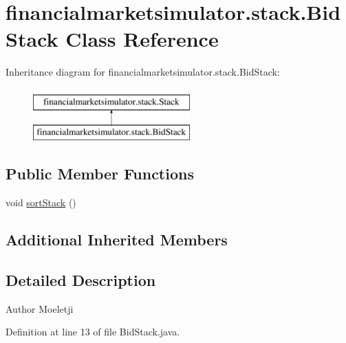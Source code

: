 \hypertarget{classfinancialmarketsimulator_1_1stack_1_1_bid_stack}{\section{financialmarketsimulator.\+stack.\+Bid\+Stack Class Reference}
\label{classfinancialmarketsimulator_1_1stack_1_1_bid_stack}
}
Inheritance diagram for financialmarketsimulator.\+stack.\+Bid\+Stack\+:\begin{figure}[H]
\begin{center}
\leavevmode
\includegraphics[height=2.000000cm]{classfinancialmarketsimulator_1_1stack_1_1_bid_stack}
\end{center}
\end{figure}
\subsection*{Public Member Functions}
\begin{DoxyCompactItemize}
\item 
void \hyperlink{classfinancialmarketsimulator_1_1stack_1_1_bid_stack_a5c2694a816c3fb93081f61554d60fc42}{sort\+Stack} ()
\end{DoxyCompactItemize}
\subsection*{Additional Inherited Members}


\subsection{Detailed Description}
\begin{DoxyAuthor}{Author}
Moeletji 
\end{DoxyAuthor}


Definition at line 13 of file Bid\+Stack.\+java.



